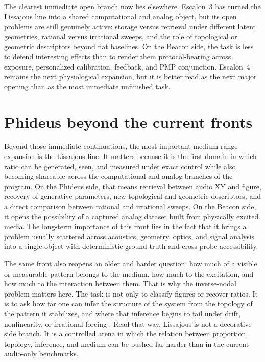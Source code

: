 The clearest immediate open branch now lies elsewhere. Escalon~3 has turned the Lissajous line into a shared computational and analog object, but its open problems are still genuinely active: storage versus retrieval under different latent geometries, rational versus irrational sweeps, and the role of topological or geometric descriptors beyond flat baselines. On the Beacon side, the task is less to defend interesting effects than to render them protocol-bearing across exposure, personalized calibration, feedback, and PMP conjunction. Escalon~4 remains the next physiological expansion, but it is better read as the next major opening than as the most immediate unfinished task.


\section{Phideus beyond the current fronts}


Beyond those immediate continuations, the most important medium-range expansion is the Lissajous line. It matters because it is the first domain in which ratio can be generated, seen, and measured under exact control while also becoming shareable across the computational and analog branches of the program. On the Phideus side, that means retrieval between audio XY and figure, recovery of generative parameters, new topological and geometric descriptors, and a direct comparison between rational and irrational sweeps. On the Beacon side, it opens the possibility of a captured analog dataset built from physically excited media. The long-term importance of this front lies in the fact that it brings a problem usually scattered across acoustics, geometry, optics, and signal analysis into a single object with deterministic ground truth and cross-probe accessibility.

The same front also reopens an older and harder question: how much of a visible or measurable pattern belongs to the medium, how much to the excitation, and how much to the interaction between them. That is why the inverse-nodal problem matters here. The task is not only to classify figures or recover ratios. It is to ask how far one can infer the structure of the system from the topology of the pattern it stabilizes, and where that inference begins to fail under drift, nonlinearity, or irrational forcing \parencite{pinasco_2021,maynard_1985}. Read that way, Lissajous is not a decorative side branch. It is a controlled arena in which the relation between proportion, topology, inference, and medium can be pushed far harder than in the current audio-only benchmarks.

